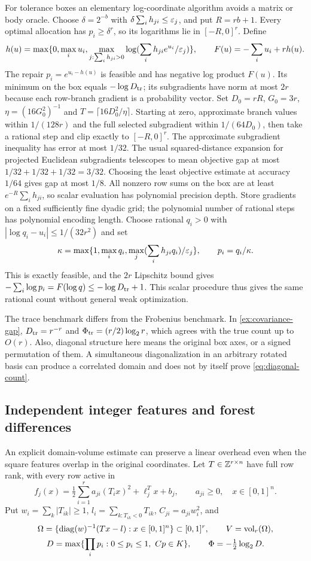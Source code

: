 For tolerance boxes an elementary log-coordinate algorithm avoids a
matrix or body oracle. Choose $\delta=2^{-b}$ with
$\delta\sum_i h_{ji}\le\varepsilon_j$, and put $R=rb+1$. Every optimal
allocation has $p_i\ge\delta^r$, so its logarithms lie in $[-R,0]^r$.
Define
\[
 h(u)=\max\{0,\max_i u_i,
     \max_{j:\sum_i h_{ji}>0}\log(\sum_i h_{ji}e^{u_i}/\varepsilon_j)\},
 \qquad F(u)=-\sum_i u_i+rh(u).
\]
The repair $p_i=e^{u_i-h(u)}$ is feasible and has negative log product
$F(u)$. Its minimum on the box equals $-\log D_{\rm tr}$; its
subgradients have norm at most $2r$ because each row-branch gradient
is a probability vector. Set $D_0=rR$, $G_0=3r$,
$\eta=(16G_0^2)^{-1}$ and $T=\lceil16D_0^2/\eta\rceil$. Starting
at zero, approximate branch values within $1/(128r)$ and the full
selected subgradient within $1/(64D_0)$, then take a rational step and
clip exactly to $[-R,0]^r$. The approximate subgradient inequality has
error at most $1/32$. The usual squared-distance expansion for projected
Euclidean subgradients telescopes to mean objective gap at most
$1/32+1/32+1/32=3/32$. Choosing the least objective estimate at accuracy
$1/64$ gives gap at most $1/8$.
All nonzero row sums on the box are at least
$e^{-R}\sum_i h_{ji}$, so scalar evaluation has polynomial precision
depth. Store gradients on a fixed sufficiently fine dyadic grid; the
polynomial number of rational steps has polynomial encoding length.
Choose rational $q_i>0$ with
$|\log q_i-u_i|\le1/(32r^2)$ and set
\[
 \kappa=\max\{1,\max_iq_i,\max_j(\sum_i h_{ji}q_i)/\varepsilon_j\},
 \qquad p_i=q_i/\kappa.
\]
This is exactly feasible, and the $2r$ Lipschitz bound gives
$-\sum_i\log p_i=F(\log q)\le-\log D_{\rm tr}+1$.
This scalar procedure thus gives the same rational count without general
weak optimization.

The trace benchmark differs from the Frobenius benchmark. In
\cref{ex:covariance-gap}, $D_{\rm tr}=r^{-r}$ and
$\Phi_{\rm tr}=(r/2)\log_2r$, which agrees with the true count up to
$O(r)$. Also, diagonal structure here means the original box axes, or
a signed permutation of them. A simultaneous diagonalization in an
arbitrary rotated basis can produce a correlated domain and does not
by itself prove \eqref{eq:diagonal-count}.

\subsection{Independent integer features and forest differences}

An explicit domain-volume estimate can preserve a linear overhead even
when the square features overlap in the original coordinates.
Let $T\in\mathbb Z^{r\times n}$ have full row rank, with every row active in
\[
 f_j(x)=\tfrac12\sum_{i=1}^r a_{ji}(T_ix)^2+\ell_j^Tx+b_j,
 \qquad a_{ji}\ge0,\quad x\in[0,1]^n.
\]
Put $w_i=\sum_k|T_{ik}|\ge1$, $l_i=\sum_{k:T_{ik}<0}T_{ik}$,
$C_{ji}=a_{ji}w_i^2$, and
\[
 \begin{gathered}
 \Omega=\{\operatorname{diag}(w)^{-1}(Tx-l):x\in[0,1]^n\}\subset[0,1]^r,
 \qquad V=\operatorname{vol}_r(\Omega),\\
 D=\max\{\prod_ip_i:0\le p_i\le1,\ Cp\in K\},
 \qquad\Phi=-\tfrac12\log_2D.
 \end{gathered}
\]

